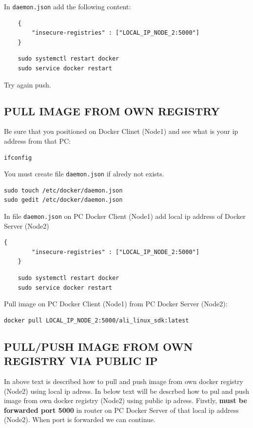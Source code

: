 \documentclass[12pt]{report}
\newcommand{\code}[1]{\texttt{#1}} %
\newcommand{\mygreen}[1]{{\color{my_green}#1}}
\newcommand{\myred}[1]{{\color{my_red}#1}}
\begin{document}
In \code{daemon.json} add the following content:
\begin{lstlisting}
	{
		"insecure-registries" : ["LOCAL_IP_NODE_2:5000"]
	}
\end{lstlisting}

\begin{lstlisting}
	sudo systemctl restart docker
	sudo service docker restart
\end{lstlisting}

Try again push.



\subsection{PULL IMAGE FROM OWN REGISTRY}

Be sure that you positioned on Docker Clinet (\mygreen{Node1}) and see what is your ip address from that PC:
\begin{lstlisting}
ifconfig
\end{lstlisting}

You must create file \code{daemon.json} if alredy not exists.
\begin{lstlisting}
sudo touch /etc/docker/daemon.json
sudo gedit /etc/docker/daemon.json
\end{lstlisting}
In file \code{daemon.json} on PC Docker Client (\mygreen{Node1}) add local ip address of Docker Server (\myred{Node2})
\begin{lstlisting}[caption= In Node1 add address of Node2.]
	{
		"insecure-registries" : ["LOCAL_IP_NODE_2:5000"]
	}
\end{lstlisting}

\begin{lstlisting}
	sudo systemctl restart docker
	sudo service docker restart
\end{lstlisting}

Pull image on PC Docker Client (\mygreen{Node1}) from PC Docker Server (\myred{Node2}):
\begin{lstlisting}[caption= Pull from Docker Server]
docker pull LOCAL_IP_NODE_2:5000/ali_linux_sdk:latest
\end{lstlisting}


\subsection{PULL/PUSH IMAGE FROM OWN REGISTRY VIA PUBLIC IP}
In above text is described how to pull and push image from own docker registry (\myred{Node2}) using local ip adress.
In below text will be descrbed how to pul and push image from own docker registry (\myred{Node2}) using public ip adress.
\newline
\newline
Firstly, \textbf {must be forwarded port 5000} in router on PC Docker Server of that local ip address (\myred{Node2}).
\newline
\newline
When port is forwarded we can continue.
\newline
\end{document}
